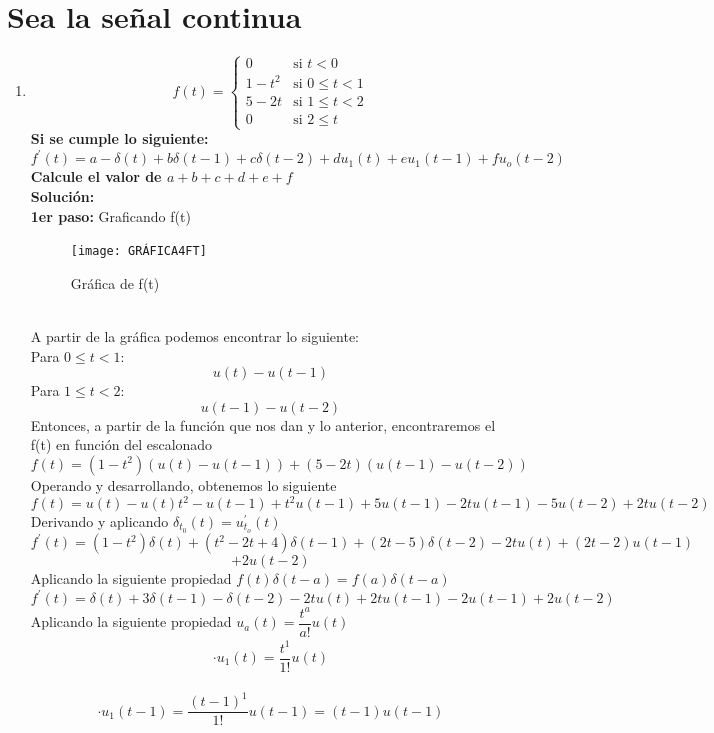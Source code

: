 \documentclass[11pt,a4paper]{article}
\begin{document}
	\section{\textbf{Sea la señal continua}}{
	\Large{
	\begin{enumerate}
	\item[\textbf{}]
	\begin{equation*}
	f(t) =
\begin{cases}
0 & \text{si $t < 0 $}\\
1-t^2 & \text{si $0 \leq t<1$}\\
5-2t & \text{si $1 \leq t<2$}\\
0 & \text{si $2 \leq t $}
\end{cases}
\end{equation*}
	\textbf{Si se cumple lo siguiente: $$f^{'}(t)=a-\delta (t)+b \delta (t-1) +c \delta (t-2) +d u_1(t)+e u_1(t-1)+f u_o(t-2)$$
	Calcule el valor de $a+b+c+d+e+f$}\\
	 \textbf{Solución:}\\
	 \textbf{1er paso:} Graficando f(t)
	 \begin{figure}[h]
	 \centering 
	\texttt{[image: GRÁFICA4FT]}
	\caption{Gráfica de f(t)}
	\label{GRÁFICA4FT}
	\end{figure}\\
	 A partir de la gráfica podemos encontrar lo siguiente:\\
	Para  $0 \leq t<1$:
	$$u(t)-u(t-1)$$	
	Para $1 \leq t<2$:
	$$u(t-1)-u(t-2)$$
Entonces, a partir de la función que nos dan y lo anterior, encontraremos el f(t) en función del escalonado
	$$f(t)=(1-t^2) (u(t)-u(t-1))+ (5-2t)(u(t-1)-u(t-2))$$
Operando y desarrollando, obtenemos lo siguiente
	$$f(t)=u(t)-u(t)t^2-u(t-1)+t^2u(t-1)+5u(t-1)-2tu(t-1)-5u(t-2)
	+2tu(t-2)$$
	Derivando y aplicando $\delta_{t_0}(t)=u_{t_o}^{'}(t)$
	$$f^{'}(t)=(1-t^2)\delta(t)+(t^2-2t+4)\delta(t-1)+(2t-5)\delta(t-2)-2tu(t)+(2t-2)u(t-1)$$
	$$+2u(t-2)$$
	Aplicando la siguiente propiedad $f(t)\delta(t-a)=f(a)\delta(t-a)$
	$$f^{'}(t)=\delta(t)+3\delta(t-1)-\delta(t-2)-2tu(t)+2tu(t-1)-2u(t-1)+2u(t-2)$$
	Aplicando la siguiente propiedad $ u_a(t)=\dfrac{t^a}{a!}u(t)$
	\begin{eqnarray}
	\label{u1}
	\cdot u_1(t)=\dfrac{t^1}{1!}u(t)
	\end{eqnarray}
	
	\begin{eqnarray}
	\label{ut-1}
	\cdot u_1(t-1)=\dfrac{(t-1)^1}{1!}u(t-1)=(t-1)u(t-1)
	\end{eqnarray}
	

\end{enumerate}}}
\end{document}
